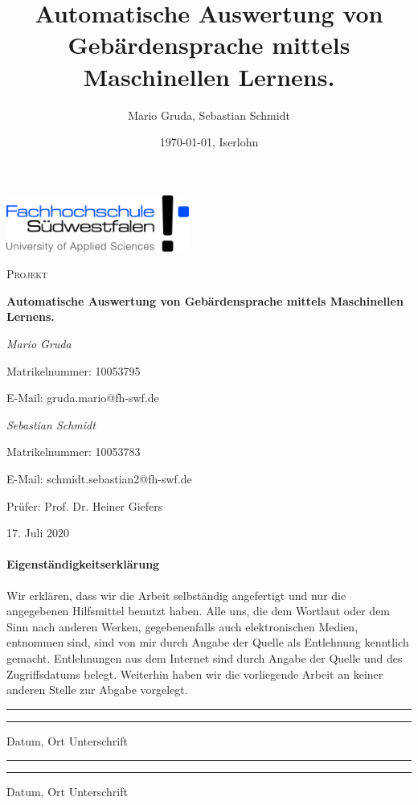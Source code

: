 \documentclass[11pt,bibliography=totocnumbered]{scrartcl}
\title{Automatische Auswertung von Gebärdensprache mittels Maschinellen Lernens.}
\author{Mario Gruda, Sebastian Schmidt}
\date{\today{}, Iserlohn}
\begin{document}
 
\setmainfont{Caladea}
\begin{titlepage}
	\centering
	\includegraphics[width=0.45\textwidth]{fh-swf-logo}\par\vspace{1cm}
	{\scshape\Large Projekt\par}
	\vspace{0.5cm}
	{\huge\bfseries Automatische Auswertung von Gebärdensprache mittels Maschinellen Lernens.\par}
	\vspace{1cm}
	{\Large\itshape Mario Gruda\par}
	Matrikelnummer: 10053795\par
	E-Mail: gruda.mario@fh-swf.de\par
	\vspace{1cm}
	{\Large\itshape Sebastian Schmidt\par}
	Matrikelnummer: 10053783\par
	E-Mail: schmidt.sebastian2@fh-swf.de\par
	\vspace{1cm}
	Prüfer: 
	Prof. Dr. Heiner Giefers
	\vfill
	
	{\large 17. Juli 2020\par}
\end{titlepage}
\pagebreak
\paragraph{Eigenständigkeitserklärung}
Wir erklären, dass wir die Arbeit selbständig angefertigt und nur die angegebenen Hilfsmittel benutzt haben. Alle uns, die dem Wortlaut oder dem Sinn nach anderen Werken, gegebenenfalls auch elektronischen Medien, entnommen sind, sind von mir durch Angabe der Quelle als Entlehnung kenntlich gemacht. Entlehnungen aus dem Internet sind durch Angabe der Quelle und des Zugriffsdatums belegt. Weiterhin haben wir die vorliegende 
Arbeit an keiner anderen Stelle zur Abgabe vorgelegt.

\vspace{50pt}
\noindent\rule{5cm}{.4pt}\hspace{4.8cm}\rule{5cm}{.4pt}\par
\noindent Datum, Ort \hspace{10.5cm} Unterschrift\par
\vspace{50pt}
\noindent\rule{5cm}{.4pt}\hspace{4.8cm}\rule{5cm}{.4pt}\par
\noindent Datum, Ort \hspace{10.5cm} Unterschrift
\pagebreak
\tableofcontents
\pagebreak
\listoffigures
\lstlistoflistings
\pagebreak
\listofmyequations
\pagebreak
{}
\pagestyle{scrheadings}
\clearscrheadfoot
\ohead[\pagemark]{\pagemark}
\ihead[]{\headmark}
\setcounter{equation}{0}
\end{document}
